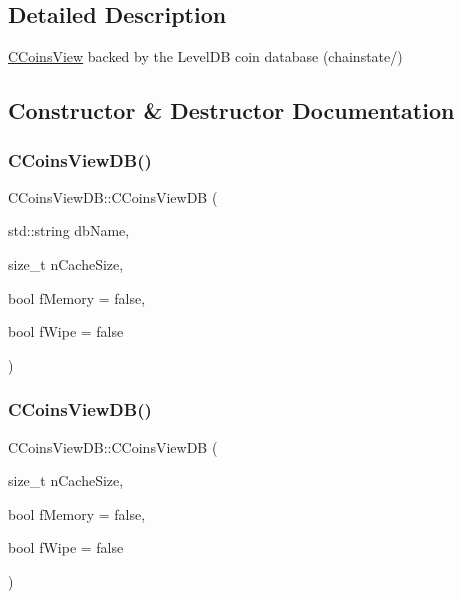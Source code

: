 \subsection{Detailed Description}
\mbox{\hyperlink{class_c_coins_view}{C\+Coins\+View}} backed by the Level\+DB coin database (chainstate/) 

\subsection{Constructor \& Destructor Documentation}
\mbox{\label{class_c_coins_view_d_b_a77de349a6beacdf07f0e4aab1bbdecbc}} 
\subsubsection{\texorpdfstring{C\+Coins\+View\+D\+B()}{CCoinsViewDB()}\hspace{0.1cm}{\footnotesize\ttfamily [1/2]}}
{\footnotesize\ttfamily C\+Coins\+View\+D\+B\+::\+C\+Coins\+View\+DB (\begin{DoxyParamCaption}\item[{std\+::string}]{db\+Name,  }\item[{size\+\_\+t}]{n\+Cache\+Size,  }\item[{bool}]{f\+Memory = {\ttfamily false},  }\item[{bool}]{f\+Wipe = {\ttfamily false} }\end{DoxyParamCaption})\hspace{0.3cm}{\ttfamily [protected]}}

\mbox{\label{class_c_coins_view_d_b_a209841b241febcccb2ec584b886ad374}} 
\subsubsection{\texorpdfstring{C\+Coins\+View\+D\+B()}{CCoinsViewDB()}\hspace{0.1cm}{\footnotesize\ttfamily [2/2]}}
{\footnotesize\ttfamily C\+Coins\+View\+D\+B\+::\+C\+Coins\+View\+DB (\begin{DoxyParamCaption}\item[{size\+\_\+t}]{n\+Cache\+Size,  }\item[{bool}]{f\+Memory = {\ttfamily false},  }\item[{bool}]{f\+Wipe = {\ttfamily false} }\end{DoxyParamCaption})}



